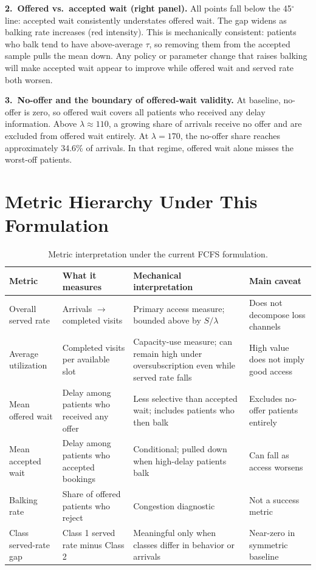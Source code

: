\documentclass[11pt]{article}
\begin{document}
\textbf{2.~Offered vs.\ accepted wait (right panel).}
All points fall below the 45$^\circ$ line: accepted wait consistently
understates offered wait. The gap widens as balking rate increases (red
intensity). This is mechanically consistent: patients who balk tend to have
above-average $\tau$, so removing them from the accepted sample pulls the
mean down. Any policy or parameter change that raises balking will make
accepted wait appear to improve while offered wait and served rate both
worsen.

\textbf{3.~No-offer and the boundary of offered-wait validity.}
At baseline, no-offer is zero, so offered wait covers all patients who
received any delay information. Above $\lambda \approx 110$, a growing
share of arrivals receive no offer and are excluded from offered wait
entirely. At $\lambda = 170$, the no-offer share reaches approximately
34.6\% of arrivals. In that regime, offered wait alone misses the
worst-off patients.

\section{Metric Hierarchy Under This Formulation}
\label{sec:metrics}

\begin{table}[H]
\centering
\renewcommand{\arraystretch}{1.2}
\begin{tabular}{p{}p{}p{}p{}}
\toprule
Metric & What it measures & Mechanical interpretation & Main caveat \\
\midrule
Overall served rate & Arrivals $\to$ completed visits & Primary access measure; bounded above by $S/\lambda$ & Does not decompose loss channels \\
Average utilization & Completed visits per available slot & Capacity-use measure; can remain high under oversubscription even while served rate falls & High value does not imply good access \\
Mean offered wait & Delay among patients who received any offer & Less selective than accepted wait; includes patients who then balk & Excludes no-offer patients entirely \\
Mean accepted wait & Delay among patients who accepted bookings & Conditional; pulled down when high-delay patients balk & Can fall as access worsens \\
Balking rate & Share of offered patients who reject & Congestion diagnostic & Not a success metric \\
Class served-rate gap & Class 1 served rate minus Class 2 & Meaningful only when classes differ in behavior or arrivals & Near-zero in symmetric baseline \\
\bottomrule
\end{tabular}
\caption{Metric interpretation under the current FCFS formulation.}
\label{tab:metrics}
\end{table}
\end{document}
